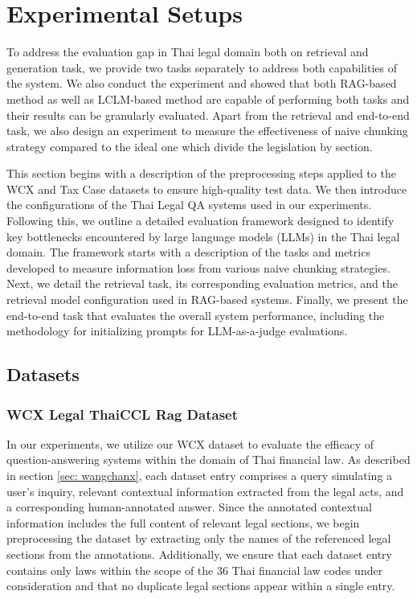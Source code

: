 \section{Experimental Setups}
\label{sec:evaluation}
To address the evaluation gap in Thai legal domain both on retrieval and generation task, we provide two tasks separately to address both capabilities of the system. We also conduct the experiment and showed that both RAG-based method as well as LCLM-based method are capable of performing both tasks and their results can be granularly evaluated. Apart from the retrieval and end-to-end task, we also design an experiment to measure the effectiveness of naive chunking strategy compared to the ideal one which divide the legislation by section.

This section begins with a description of the preprocessing steps applied to the WCX and Tax Case datasets to ensure high-quality test data. We then introduce the configurations of the Thai Legal QA systems used in our experiments. Following this, we outline a detailed evaluation framework designed to identify key bottlenecks encountered by large language models (LLMs) in the Thai legal domain. The framework starts with a description of the tasks and metrics developed to measure information loss from various naive chunking strategies. Next, we detail the retrieval task, its corresponding evaluation metrics, and the retrieval model configuration used in RAG-based systems. Finally, we present the end-to-end task that evaluates the overall system performance, including the methodology for initializing prompts for LLM-as-a-judge evaluations.

\subsection{Datasets}
\subsubsection{WCX Legal ThaiCCL Rag Dataset}
\label{subsubsec:wangchanx_dataset}

In our experiments, we utilize our WCX dataset to evaluate the efficacy of question-answering systems within the domain of Thai financial law. As described in section \ref{sec: wangchanx}, each dataset entry comprises a query simulating a user's inquiry, relevant contextual information extracted from the legal acts, and a corresponding human-annotated answer. 
Since the annotated contextual information includes the full content of relevant legal sections, we begin preprocessing the dataset by extracting only the names of the referenced legal sections from the annotations. Additionally, we ensure that each dataset entry contains only laws within the scope of the 36 Thai financial law codes under consideration and that no duplicate legal sections appear within a single entry.

